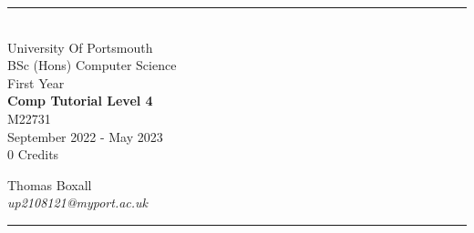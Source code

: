 \documentclass[a4paper, 11pt]{report}
\begin{document}
\begin{titlepage}
    \rule{\textwidth}{1px}
    \vspace{0.025\textheight}\\
    \huge{University Of Portsmouth}\\
    \huge{BSc (Hons) Computer Science}\\
    \huge{First Year}\\
    \vfill
    \LARGE{\textbf{Comp Tutorial Level 4}}\\
    \Large{M22731}\\
    \large{September 2022 - May 2023}\\
    \large{0 Credits}
    \vfill

    
    \begin{FlushRight}
        \large{Thomas Boxall}\\
        \textit{up2108121@myport.ac.uk}\\
        
    \end{FlushRight}
    \vspace{0.2\textheight}
    \rule{\textwidth}{1px}
    
\end{titlepage}

\tableofcontents


\end{document}
